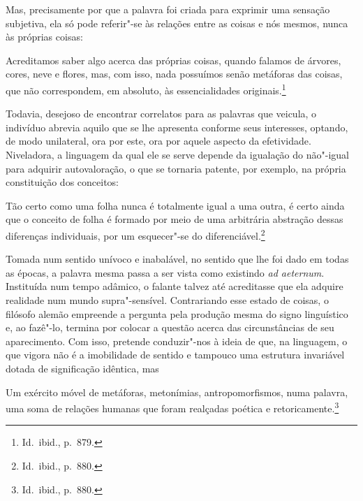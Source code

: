 Mas, precisamente por que a palavra foi criada para exprimir uma
sensação subjetiva, ela só pode referir"-se às relações entre as
coisas e nós mesmos, nunca às próprias coisas: 

\begin{hedraquote}
Acreditamos saber algo
acerca das próprias coisas, quando falamos de árvores, cores, neve e
flores, mas, com isso, nada possuímos senão metáforas das coisas, que
não correspondem, em absoluto, às essencialidades originais.\footnote{
Id.~ibid., p.~879.}
\end{hedraquote}

Todavia, desejoso de encontrar correlatos para as
palavras que veicula, o indivíduo abrevia aquilo que se lhe apresenta
conforme seus interesses, optando, de modo unilateral, ora por este,
ora por aquele aspecto da efetividade. Niveladora, a linguagem da qual
ele se serve depende da igualação do não"-igual para adquirir
autovaloração, o que se tornaria patente, por exemplo, na própria
constituição dos conceitos: 

\begin{hedraquote}
Tão certo como uma folha
nunca é totalmente igual a uma outra, é certo ainda que o conceito de
folha é formado por meio de uma arbitrária abstração dessas diferenças
individuais, por um esquecer"-se 
do diferenciável.\footnote{ Id.~ibid., p.~880.}
\end{hedraquote}

Tomada num sentido unívoco e inabalável, no sentido que lhe foi dado em
todas as épocas, a palavra mesma passa a ser vista como existindo
\textit{ad aeternum}. Instituída num tempo adâmico, o falante talvez
até acreditasse que ela adquire realidade num mundo
supra"-sensível. Contrariando esse estado de coisas, o filósofo alemão
empreende a pergunta pela produção mesma do signo linguístico e, ao
fazê"-lo, termina por colocar a questão acerca das circunstâncias de
seu aparecimento. Com isso, pretende conduzir"-nos à ideia de que, na
linguagem, o que vigora não é a imobilidade de sentido e tampouco uma
estrutura invariável dotada de significação idêntica, mas 

\begin{hedraquote}
Um exército
móvel de metáforas, metonímias, antropomorfismos, numa palavra, uma
soma de relações humanas que foram realçadas poética e
retoricamente.\footnote{ Id.~ibid., p.~880.}
\end{hedraquote}


